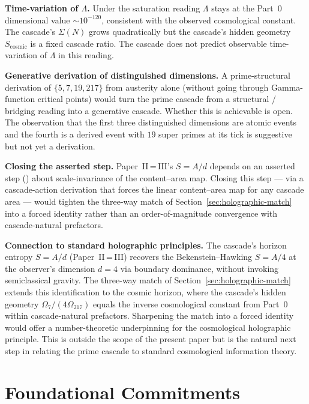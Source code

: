 \documentclass[11pt,a4paper]{article}
\begin{document}
\textbf{Time-variation of $\Lambda$.} Under the saturation reading
$\Lambda$ stays at the Part~0 dimensional value $\sim 10^{-120}$,
consistent with the observed cosmological constant. The cascade's
$\Sigma(N)$ grows quadratically but the cascade's hidden geometry
$S_{\mathrm{cosmic}}$ is a fixed cascade ratio. The cascade does not
predict observable time-variation of $\Lambda$ in this reading.

\textbf{Generative derivation of distinguished dimensions.} A
prime-structural derivation of $\{5, 7, 19, 217\}$ from austerity
alone (without going through Gamma-function critical points) would
turn the prime cascade from a structural / bridging reading into a
generative cascade. Whether this is achievable is open. The
observation that the first three distinguished dimensions are atomic
events and the fourth is a derived event with $19$ super primes at
its tick is suggestive but not yet a derivation.

\textbf{Closing the asserted step.} Paper~II\,=\,III's
$S = A/d$ depends on an asserted step
() about scale-invariance of the
content--area map. Closing this step --- via a cascade-action
derivation that forces the linear content--area map for any cascade
area --- would tighten the three-way match of
Section~\ref{sec:holographic-match} into a forced identity rather
than an order-of-magnitude convergence with cascade-natural
prefactors.

\textbf{Connection to standard holographic principles.} The
cascade's horizon entropy $S = A/d$ (Paper~II\,=\,III) recovers the
Bekenstein--Hawking $S = A/4$ at the observer's dimension $d = 4$
via boundary dominance, without invoking semiclassical gravity. The
three-way match of Section~\ref{sec:holographic-match} extends this
identification to the cosmic horizon, where the cascade's hidden
geometry $\Omega_7/(4\Omega_{217})$ equals the inverse cosmological
constant from Part~0 within cascade-natural prefactors. Sharpening
the match into a forced identity would offer a number-theoretic
underpinning for the cosmological holographic principle. This is
outside the scope of the present paper but is the natural next step
in relating the prime cascade to standard cosmological information
theory.

\section{Foundational Commitments}\label{sec:foundational-commitments}
\end{document}
